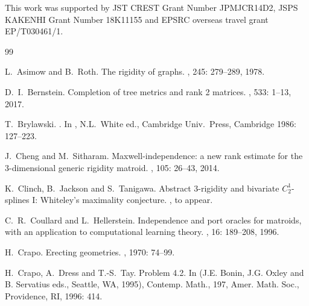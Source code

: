 \documentclass{daj}
\begin{document}
This work was supported by JST CREST Grant Number JPMJCR14D2, JSPS KAKENHI Grant Number 18K11155 and EPSRC overseas travel grant EP/T030461/1.

\begin{thebibliography}{99}
%

L.~Asimow and B.~Roth. 
\newblock The rigidity of graphs.
,
245:  279--289, 1978.

D.~I.~Bernstein. 
\newblock Completion of tree metrics and rank 2 matrices.
, 533: 1--13, 2017.



T.~Brylawski. 
. In 
, N.L.~White ed., Cambridge Univ.~Press, Cambridge 1986: 127--223.

J.~Cheng and M.~Sitharam. 
\newblock 
Maxwell-independence: a new rank estimate for the 3-dimensional generic rigidity matroid.
,
105: 26--43, 2014.

K.~Clinch, B.~Jackson and S.~Tanigawa. 
\newblock 
Abstract 3-rigidity and bivariate $C_2^1$-splines I: Whiteley's
maximality conjecture.
, to appear.

C.~R.~Coullard and L.~Hellerstein. 
\newblock 
Independence and
port oracles for matroids, with an application to computational
learning theory.
, 16: %
189--208, 1996.

H.~Crapo. 
\newblock  Erecting geometries.
,  1970: 74--99.

 H.~Crapo, A.~Dress and T.-S.~Tay. 
\newblock 
Problem 4.2. In
 (J.E. Bonin, J.G. Oxley and B. Servatius eds.,
Seattle, WA, 1995),
Contemp. Math., 197, Amer. Math. Soc., Providence, RI, 1996: 414.




\end{thebibliography}
\end{document}
